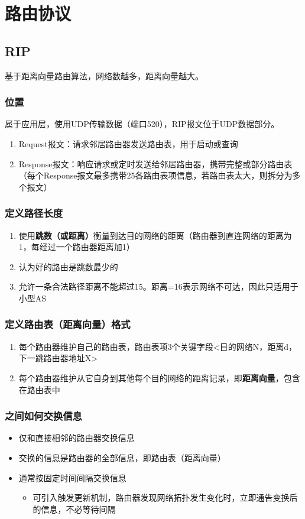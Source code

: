\section{路由协议}

\subsection{RIP}
基于距离向量路由算法，网络数越多，距离向量越大。

\subsubsection{位置}
属于应用层，使用UDP传输数据（端口520），RIP报文位于UDP数据部分。
\begin{enumerate}
    \item Request报文：请求邻居路由器发送路由表，用于启动或查询
    \item Response报文：响应请求或定时发送给邻居路由器，携带完整或部分路由表（每个Response报文最多携带25各路由表项信息，若路由表太大，则拆分为多个报文）
\end{enumerate}


\subsubsection{定义路径长度}
\begin{enumerate}
    \item 使用\textbf{跳数（或距离）}衡量到达目的网络的距离（路由器到直连网络的距离为1，每经过一个路由器距离加1）
    \item 认为好的路由是跳数最少的
    \item 允许一条合法路径距离不能超过15。距离=16表示网络不可达，因此只适用于小型AS
\end{enumerate}


\subsubsection{定义路由表（距离向量）格式}
\begin{enumerate}
    \item 每个路由器维护自己的路由表，路由表项3个关键字段<目的网络N，距离d，下一跳路由器地址X>
    \item 每个路由器维护从它自身到其他每个目的网络的距离记录，即\textbf{距离向量}，包含在路由表中
\end{enumerate}


\subsubsection{之间如何交换信息}
\begin{itemize}
    \item 仅和直接相邻的路由器交换信息
    \item 交换的信息是路由器的全部信息，即路由表（距离向量）
    \item 通常按固定时间间隔交换信息\begin{itemize}
        \item 可引入触发更新机制，路由器发现网络拓扑发生变化时，立即通告变换后的信息，不必等待间隔
    \end{itemize}
\end{itemize}


